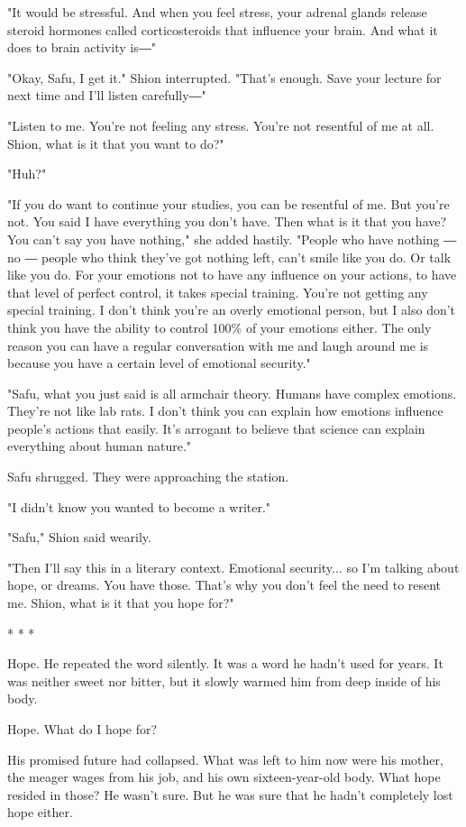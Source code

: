 "It would be stressful. And when you feel stress, your adrenal glands
release steroid hormones called corticosteroids that influence your
brain. And what it does to brain activity is―"

"Okay, Safu, I get it." Shion interrupted. "That's enough. Save your
lecture for next time and I'll listen carefully―"

"Listen to me. You're not feeling any stress. You're not resentful of me
at all. Shion, what is it that you want to do?"

"Huh?"

"If you do want to continue your studies, you can be resentful of me.
But you're not. You said I have everything you don't have. Then what is
it that you have? You can't say you have nothing," she added hastily.
"People who have nothing ― no ― people who think they've got nothing
left, can't smile like you do. Or talk like you do. For your emotions
not to have any influence on your actions, to have that level of perfect
control, it takes special training. You're not getting any special
training. I don't think you're an overly emotional person, but I also
don't think you have the ability to control 100\% of your emotions
either. The only reason you can have a regular conversation with me and
laugh around me is because you have a certain level of emotional
security."

"Safu, what you just said is all armchair theory. Humans have complex
emotions. They're not like lab rats. I don't think you can explain how
emotions influence people's actions that easily. It's arrogant to
believe that science can explain everything about human nature."

Safu shrugged. They were approaching the station.

"I didn't know you wanted to become a writer."

"Safu," Shion said wearily.

"Then I'll say this in a literary context. Emotional security... so I'm
talking about hope, or dreams. You have those. That's why you don't feel
the need to resent me. Shion, what is it that you hope for?"

* * *

Hope. He repeated the word silently. It was a word he hadn't used for
years. It was neither sweet nor bitter, but it slowly warmed him from
deep inside of his body.

Hope. What do I hope for?

His promised future had collapsed. What was left to him now were his
mother, the meager wages from his job, and his own sixteen-year-old
body. What hope resided in those? He wasn't sure. But he was sure that
he hadn't completely lost hope either.


